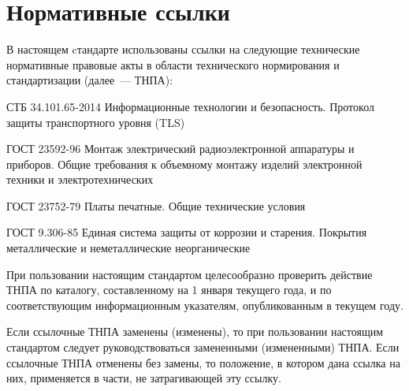\chapter{Нормативные ссылки}\label{Refs}

В настоящем cтандарте использованы ссылки на следующие 
технические нормативные правовые акты в области 
технического нормирования и стандартизации (далее~--- ТНПА):

СТБ 34.101.65-2014 Информационные технологии и безопасность. Протокол защиты 
транспортного уровня (TLS)

ГОСТ 23592-96
Монтаж электрический радиоэлектронной аппаратуры и приборов. Общие требования к 
объемному монтажу изделий электронной техники и электротехнических

ГОСТ 23752-79 
Платы печатные. Общие технические условия

ГОСТ 9.306-85 
Единая система защиты от коррозии и старения.
Покрытия металлические и неметаллические неорганические

\begin{note*}
При пользовании настоящим стандартом целесообразно 
проверить действие ТНПА по каталогу,
составленному на 1 января текущего года, и по соответствующим 
информационным указателям, опубликованным в текущем году.

Если ссылочные ТНПА заменены (изменены), то при пользовании настоящим 
стандартом следует руководствоваться замененными (измененными) ТНПА. 
Если ссылочные ТНПА отменены без замены, то положение, в котором 
дана ссылка на них, применяется в части, не затрагивающей эту ссылку.
\end{note*}


